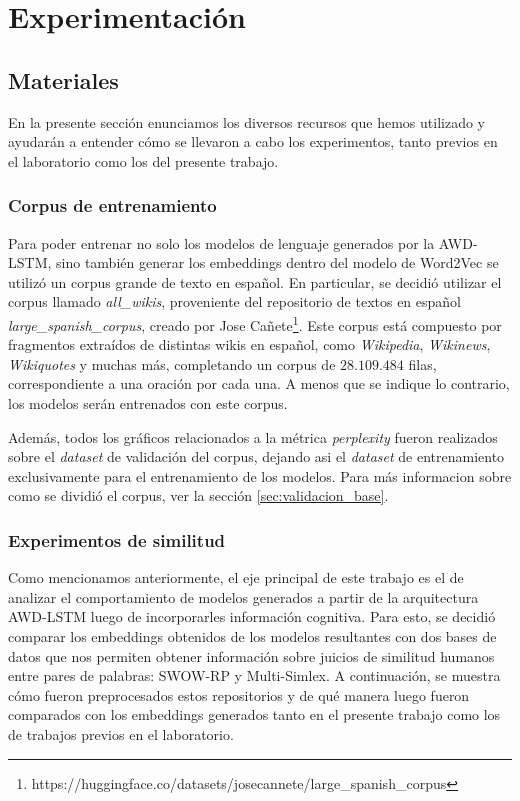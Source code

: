 \chapter{Experimentación}

\section{Materiales}

En la presente sección enunciamos los diversos recursos que hemos utilizado y ayudarán a entender cómo se llevaron a cabo los experimentos, tanto previos en el laboratorio como los del presente trabajo.

\subsection{Corpus de entrenamiento}

Para poder entrenar no solo los modelos de lenguaje generados por la AWD-LSTM, 
sino también generar los embeddings dentro del modelo de Word2Vec se utilizó un 
corpus grande de texto en español. En particular, se decidió utilizar el corpus 
llamado \textit{all\_wikis}, proveniente del repositorio de textos en español 
\textit{large\_spanish\_corpus}, creado por Jose Cañete\footnote{https://huggingface.co/datasets/josecannete/large\_spanish\_corpus}.
Este corpus está compuesto por fragmentos extraídos de distintas wikis en español, 
como \textit{Wikipedia}, \textit{Wikinews}, \textit{Wikiquotes} y muchas más, completando un corpus de $28.109.484$ filas, 
correspondiente a una oración por cada una. A menos que se indique lo contrario, 
los modelos serán entrenados con este corpus.

Además, todos los gráficos relacionados a la métrica \textit{perplexity} fueron realizados sobre el \textit{dataset} de validación del corpus, dejando asi el \textit{dataset} de entrenamiento exclusivamente para el entrenamiento de los modelos. Para más informacion sobre como se dividió el corpus, ver la sección \ref{sec:validacion_base}.


\subsection{Experimentos de similitud}

\label{sec:experimentos_similitud}

Como mencionamos anteriormente, el eje principal de este trabajo es el de analizar el 
comportamiento de modelos generados a partir de la arquitectura AWD-LSTM luego de incorporarles 
información cognitiva. Para esto, se decidió comparar los embeddings obtenidos de los modelos 
resultantes con dos bases de datos que nos permiten obtener información sobre juicios de similitud 
humanos entre pares de palabras: SWOW-RP y Multi-Simlex. A continuación, se muestra cómo fueron 
preprocesados estos repositorios y de qué manera luego fueron comparados con los embeddings 
generados tanto en el presente trabajo como los de trabajos previos en el laboratorio.

